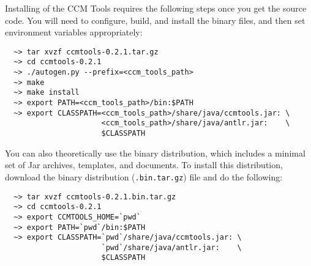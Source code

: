 Installing of the CCM Tools requires the following steps once you get the source
code. You will need to configure, build, and install the binary files, and then
set environment variables appropriately:
\begin{small}
\begin{verbatim}
  ~> tar xvzf ccmtools-0.2.1.tar.gz
  ~> cd ccmtools-0.2.1
  ~> ./autogen.py --prefix=<ccm_tools_path>
  ~> make
  ~> make install
  ~> export PATH=<ccm_tools_path>/bin:$PATH
  ~> export CLASSPATH=<ccm_tools_path>/share/java/ccmtools.jar: \
                      <ccm_tools_path>/share/java/antlr.jar:    \
                      $CLASSPATH
\end{verbatim}
\end{small}

You can also theoretically use the binary distribution, which includes a minimal
set of Jar archives, templates, and documents. To install this distribution,
download the binary distribution ({\tt *.bin.tar.gz}) file and do the following:
\begin{small}
\begin{verbatim}
  ~> tar xvzf ccmtools-0.2.1.bin.tar.gz
  ~> cd ccmtools-0.2.1
  ~> export CCMTOOLS_HOME=`pwd`
  ~> export PATH=`pwd`/bin:$PATH
  ~> export CLASSPATH=`pwd`/share/java/ccmtools.jar: \
                      `pwd`/share/java/antlr.jar:    \
                      $CLASSPATH
\end{verbatim}
\end{small}

